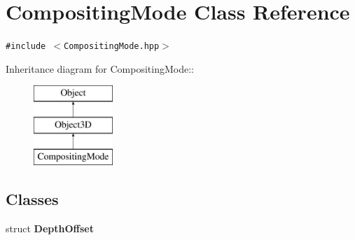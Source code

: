 \hypertarget{classm3g_1_1CompositingMode}{
\section{CompositingMode Class Reference}
\label{classm3g_1_1CompositingMode}
}
{\tt \#include $<$CompositingMode.hpp$>$}

Inheritance diagram for CompositingMode::\begin{figure}[H]
\begin{center}
\leavevmode
\includegraphics[height=3cm]{classm3g_1_1CompositingMode}
\end{center}
\end{figure}
\subsection*{Classes}
\begin{CompactItemize}
\item 
struct \textbf{DepthOffset}
\end{CompactItemize}
